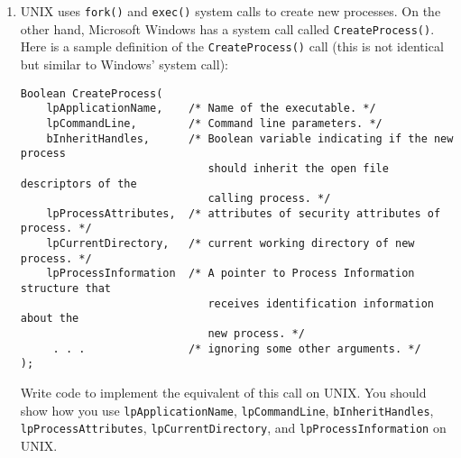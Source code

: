 \begin{enumerate}
\item
UNIX uses {\tt fork()} and {\tt exec()} system calls to create new processes. On the other hand, Microsoft
Windows has a system call called {\tt CreateProcess()}.
Here is a sample definition of the
{\tt CreateProcess()} call
(this is not identical but similar to Windows’ system call):
\begin{verbatim}
Boolean CreateProcess(
    lpApplicationName,    /* Name of the executable. */
    lpCommandLine,        /* Command line parameters. */
    bInheritHandles,      /* Boolean variable indicating if the new process
                             should inherit the open file descriptors of the
                             calling process. */
    lpProcessAttributes,  /* attributes of security attributes of process. */
    lpCurrentDirectory,   /* current working directory of new process. */
    lpProcessInformation  /* A pointer to Process Information structure that
                             receives identification information about the
                             new process. */
     . . .                /* ignoring some other arguments. */
);
\end{verbatim}
Write code to implement the equivalent of this call on UNIX. You should show how you use
{\tt lpApplicationName}, {\tt lpCommandLine}, {\tt bInheritHandles},
{\tt lpProcessAttributes}, {\tt lpCurrentDirectory}, and {\tt lpProcessInformation}
on
UNIX.


\end{enumerate}

